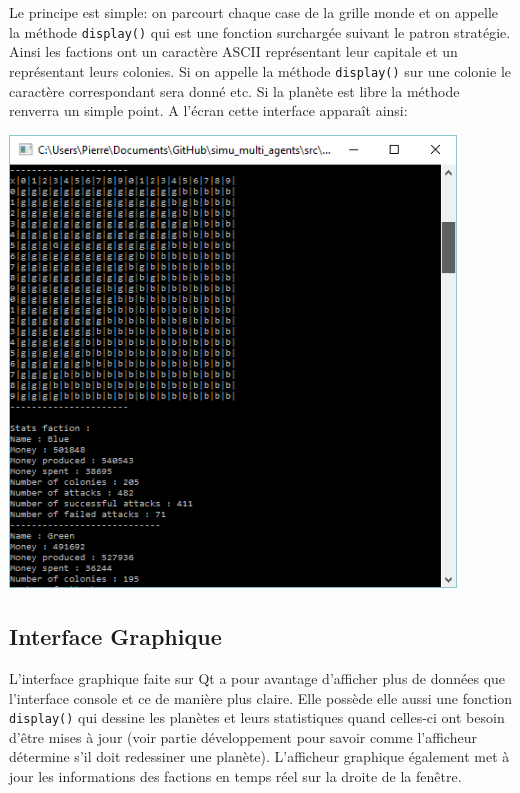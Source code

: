 
  Le principe est simple: on parcourt chaque case de la grille monde et on appelle la méthode \texttt{display()} qui est une fonction surchargée suivant le patron stratégie. Ainsi les factions ont un caractère ASCII représentant leur capitale et un représentant leurs colonies. Si on appelle la méthode \texttt{display()} sur une colonie le caractère correspondant sera donné etc. Si la planète est libre la méthode renverra un simple point.
  A l’écran cette interface apparaît ainsi:
  \begin{center}
    \includegraphics[height=12cm]{images/console.png}
  \end{center}


  \subsection{Interface Graphique}
  L’interface graphique faite sur Qt a pour avantage d’afficher plus de données que l’interface console et ce de manière plus claire. Elle possède elle aussi une fonction \texttt{display()} qui dessine les planètes et leurs statistiques quand celles-ci ont besoin d'être mises à jour (voir partie développement pour savoir comme l’afficheur détermine s’il doit redessiner une planète). L’afficheur graphique également met à jour les informations des factions en temps réel sur la droite de la fenêtre.
  
